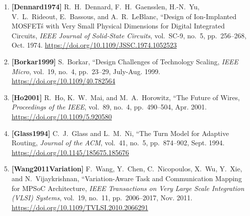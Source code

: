 \begin{enumerate}
    \item \textbf{[Dennard1974]} R.~H.~Dennard, F.~H.~Gaensslen, H.-N.~Yu, V.~L.~Rideout, E.~Bassous, and A.~R.~LeBlanc, ``Design of Ion-Implanted MOSFET\'s with Very Small Physical Dimensions for Digital Integrated Circuits, \emph{IEEE Journal of Solid-State Circuits}, vol.~SC-9, no.~5, pp.~256--268, Oct. 1974. \url{https://doi.org/10.1109/JSSC.1974.1052523}
    \item \textbf{[Borkar1999]} S.~Borkar, ``Design Challenges of Technology Scaling, \emph{IEEE Micro}, vol.~19, no.~4, pp.~23--29, July-Aug. 1999. \url{https://doi.org/10.1109/40.782564}
    \item \textbf{[Ho2001]} R.~Ho, K.~W.~Mai, and M.~A.~Horowitz, ``The Future of Wires, \emph{Proceedings of the IEEE}, vol.~89, no.~4, pp.~490--504, Apr. 2001. \url{https://doi.org/10.1109/5.920580}
    \item \textbf{[Glass1994]} C.~J.~Glass and L.~M.~Ni, ``The Turn Model for Adaptive Routing, \emph{Journal of the ACM}, vol.~41, no.~5, pp.~874--902, Sept. 1994. \url{https://doi.org/10.1145/185675.185676}
    \item \textbf{[Wang2011Variation]} F.~Wang, Y.~Chen, C.~Nicopoulos, X.~Wu, Y.~Xie, and N.~Vijaykrishnan, ``Variation-Aware Task and Communication Mapping for MPSoC Architecture, \emph{IEEE Transactions on Very Large Scale Integration (VLSI) Systems}, vol.~19, no.~11, pp.~2006--2017, Nov. 2011. \url{https://doi.org/10.1109/TVLSI.2010.2066291}
\end{enumerate}
